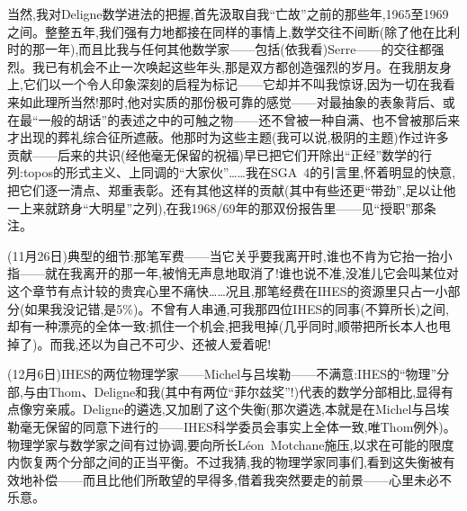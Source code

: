 当然,我对Deligne数学进法的把握,首先汲取自我“亡故”之前的那些年,1965至1969之间。整整五年,我们强有力地都接在同样的事情上,数学交往不间断(除了他在比利时的那一年),而且比我与任何其他数学家——包括(依我看)Serre——的交往都强烈。我已有机会不止一次唤起这些年头,那是双方都创造强烈的岁月。在我朋友身上,它们以一个令人印象深刻的启程为标记——它却并不叫我惊讶,因为一切在我看来如此理所当然!那时,他对实质的那份极可靠的感觉——对最抽象的表象背后、或在最“一般的胡话”的表述之中的可触之物——还不曾被一种自满、也不曾被那后来才出现的葬礼综合征所遮蔽。他那时为这些主题(我可以说,极阴的主题)作过许多贡献——后来的共识(经他毫无保留的祝福)早已把它们开除出“正经”数学的行列:topos的形式主义、上同调的“大家伙”……我在SGA~4的引言里,怀着明显的快意,把它们逐一清点、郑重表彰\dmark{}。还有其他这样的贡献(其中有些还更“带劲”,足以让他一上来就跻身“大明星”之列),在我1968/69年的那双份报告里——见“授职”那条注。

\label{ch18:local:n41}

(11月26日)典型的细节:那笔军费——当它关乎要我离开时,谁也不肯为它抬一抬小指——就在我离开的那一年,被悄无声息地取消了!谁也说不准,没准儿它会叫某位对这个章节有点计较的贵宾心里不痛快……况且,那笔经费在IHES的资源里只占一小部分(如果我没记错,是5\%)。不曾有人串通,可我那四位IHES的同事(不算所长)之间,却有一种漂亮的全体一致:抓住一个机会,把我甩掉(几乎同时,顺带把所长本人也甩掉了)。而我,还以为自己不可少、还被人爱着呢!

(12月6日)IHES的两位物理学家——Michel与吕埃勒——不满意:IHES的“物理”分部,与由Thom、Deligne和我(其中有两位“菲尔兹奖”!)代表的数学分部相比,显得有点像穷亲戚。Deligne的遴选,又加剧了这个失衡(那次遴选,本就是在Michel与吕埃勒毫无保留的同意下进行的——IHES科学委员会事实上全体一致,唯Thom例外)。物理学家与数学家之间有过协调,要向所长Léon~Motchane施压,以求在可能的限度内恢复两个分部之间的正当平衡\dmark{}。不过我猜,我的物理学家同事们,看到这失衡被有效地补偿——而且比他们所敢望的早得多,借着我突然要走的前景——心里未必不乐意。

